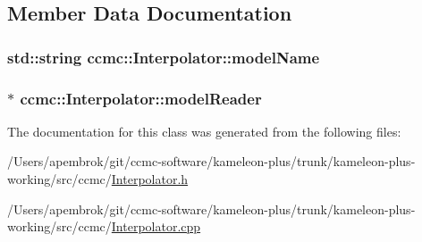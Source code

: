 \subsection{Member Data Documentation}
\hypertarget{classccmc_1_1_interpolator_a7b86407984c4ce59643b926064bdb364}{
\subsubsection[{model\-Name}]{\setlength{\rightskip}{0pt plus 5cm}std\-::string ccmc\-::\-Interpolator\-::model\-Name\hspace{0.3cm}{\ttfamily [protected]}}}\label{classccmc_1_1_interpolator_a7b86407984c4ce59643b926064bdb364}
\hypertarget{classccmc_1_1_interpolator_afee5bb61e5d5a0a7b9152c6f74378c4a}{
\subsubsection[{model\-Reader}]{$\ast$ ccmc\-::\-Interpolator\-::model\-Reader\hspace{0.3cm}{\ttfamily [protected]}}}\label{classccmc_1_1_interpolator_afee5bb61e5d5a0a7b9152c6f74378c4a}


The documentation for this class was generated from the following files\-:\begin{DoxyCompactItemize}
\item 
/\-Users/apembrok/git/ccmc-\/software/kameleon-\/plus/trunk/kameleon-\/plus-\/working/src/ccmc/\hyperlink{_interpolator_8h}{Interpolator.\-h}\item 
/\-Users/apembrok/git/ccmc-\/software/kameleon-\/plus/trunk/kameleon-\/plus-\/working/src/ccmc/\hyperlink{_interpolator_8cpp}{Interpolator.\-cpp}\end{DoxyCompactItemize}
